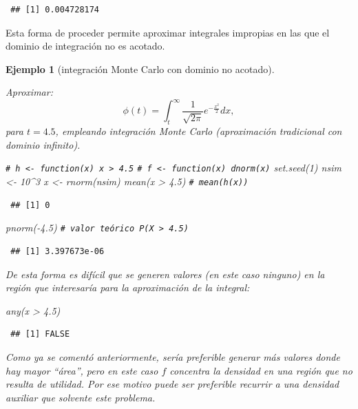 \documentclass[
]{book}
\newenvironment{Shaded}{\begin{snugshade}}{\end{snugshade}}
\newcommand{\CommentTok}[1]{\textcolor[rgb]{0.56,0.35,0.01}{\textit{#1}}}
\newcommand{\DecValTok}[1]{\textcolor[rgb]{0.00,0.00,0.81}{#1}}
\newcommand{\FloatTok}[1]{\textcolor[rgb]{0.00,0.00,0.81}{#1}}
\newcommand{\FunctionTok}[1]{\textcolor[rgb]{0.00,0.00,0.00}{#1}}
\newcommand{\NormalTok}[1]{#1}
\newcommand{\OtherTok}[1]{\textcolor[rgb]{0.56,0.35,0.01}{#1}}
\newcommand{\SpecialCharTok}[1]{\textcolor[rgb]{0.00,0.00,0.00}{#1}}
\theoremstyle{break}
\newtheorem{example}{Ejemplo}[chapter]
\theoremstyle{nonumberplain}
\renewcommand{\CommentTok}[1]{\textcolor[rgb]{0.41,0.41,0.41}{\texttt{#1}}}
\begin{document}
\begin{verbatim}
 ## [1] 0.004728174
\end{verbatim}

Esta forma de proceder permite aproximar integrales impropias en las que el dominio de integración no es acotado.

\begin{example}[integración Monte Carlo con dominio no acotado]
\protect\hypertarget{exm:mc-intinf}{}\label{exm:mc-intinf}

Aproximar:
\[\phi(t)=\int_{t}^{\infty}\frac1{\sqrt{2\pi}}e^{-\frac{x^2}2}dx,\]
para \(t=4.5\), empleando integración Monte Carlo (aproximación tradicional con dominio infinito).

\begin{Shaded}
\begin{Highlighting}[]
\CommentTok{\# h \textless{}{-} function(x) x \textgreater{} 4.5}
\CommentTok{\# f \textless{}{-} function(x) dnorm(x)}
\FunctionTok{set.seed}\NormalTok{(}\DecValTok{1}\NormalTok{)}
\NormalTok{nsim }\OtherTok{\textless{}{-}} \DecValTok{10}\SpecialCharTok{\^{}}\DecValTok{3}
\NormalTok{x }\OtherTok{\textless{}{-}} \FunctionTok{rnorm}\NormalTok{(nsim)}
\FunctionTok{mean}\NormalTok{(x }\SpecialCharTok{\textgreater{}} \FloatTok{4.5}\NormalTok{) }\CommentTok{\# mean(h(x))}
\end{Highlighting}
\end{Shaded}

\begin{verbatim}
 ## [1] 0
\end{verbatim}

\begin{Shaded}
\begin{Highlighting}[]
\FunctionTok{pnorm}\NormalTok{(}\SpecialCharTok{{-}}\FloatTok{4.5}\NormalTok{)  }\CommentTok{\# valor teórico P(X \textgreater{} 4.5) }
\end{Highlighting}
\end{Shaded}

\begin{verbatim}
 ## [1] 3.397673e-06
\end{verbatim}

De esta forma es difícil que se generen valores (en este caso ninguno) en la región que interesaría para la aproximación de la integral:

\begin{Shaded}
\begin{Highlighting}[]
\FunctionTok{any}\NormalTok{(x }\SpecialCharTok{\textgreater{}} \FloatTok{4.5}\NormalTok{)}
\end{Highlighting}
\end{Shaded}

\begin{verbatim}
 ## [1] FALSE
\end{verbatim}

Como ya se comentó anteriormente, sería preferible generar más valores donde hay mayor ``área'', pero en este caso \(f\) concentra la densidad en una región que no resulta de utilidad.
Por ese motivo puede ser preferible recurrir a una densidad auxiliar que solvente este problema.
\end{example}
\end{document}
